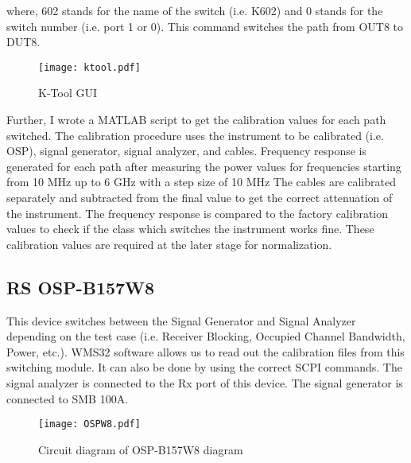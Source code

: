where, 602 stands for the name of the switch (i.e. K602) and 0 stands for the switch number (i.e. port 1 or 0). This command switches the path from OUT8 to DUT8. 

\begin{figure}[H]
\centering
\texttt{[image: ktool.pdf]}
\caption{K-Tool \acs{GUI}}
\label{fig:ktool}
\end{figure}

Further, I wrote a MATLAB\textregistered{} script to get the calibration values for each path switched. The calibration procedure uses the instrument to be calibrated (i.e. \acs{OSP}), signal generator, signal analyzer, and cables. Frequency response is generated for each path after measuring the power values for frequencies starting from 10 MHz up to 6 GHz with a step size of 10 MHz The cables are calibrated separately and subtracted from the final value to get the correct attenuation of the instrument. The frequency response is compared to the factory calibration values to check if the class which switches the instrument works fine. These calibration values are required at the later stage for normalization.

\subsection{\acs{RS}\textregistered{} \ac{OSP}-B157W8}
This device switches between the Signal Generator and Signal Analyzer depending on the test case (i.e. Receiver Blocking, Occupied Channel Bandwidth, Power, etc.). WMS32 software allows us to read out the calibration files from this switching module. It can also be done by using the correct \acs{SCPI} commands. The signal analyzer is connected to the Rx port of this device. The signal generator is connected to SMB 100A.

\begin{figure}[H]
\centering
\texttt{[image: OSPW8.pdf]}
\caption{Circuit diagram of \acs{OSP}-B157W8 diagram}
\label{fig:ospw8l}
\end{figure}




